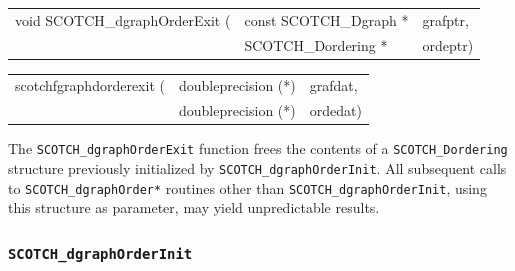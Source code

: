 \begin{itemize}
\progsyn

{\tt\begin{tabular}{l@{}ll}
void SCOTCH\_dgraphOrderExit ( & const SCOTCH\_Dgraph * & grafptr, \\
                               & SCOTCH\_Dordering *    & ordeptr)
\end{tabular}}

{\tt\begin{tabular}{l@{}ll}
scotchfgraphdorderexit ( & doubleprecision (*) & grafdat, \\
                         & doubleprecision (*) & ordedat)
\end{tabular}}

\progdes

The {\tt SCOTCH\_dgraphOrderExit} function frees the contents of a
{\tt SCOTCH\_\lbt Dordering} structure previously initialized by
{\tt SCOTCH\_\lbt dgraph\lbt Order\lbt Init}. All subsequent calls to
{\tt SCOTCH\_\lbt dgraph\lbt Order*} routines other than
{\tt SCOTCH\_\lbt dgraph\lbt Order\lbt Init}, using this structure
as parameter, may yield unpredictable results.
\end{itemize}

\subsubsection{{\tt SCOTCH\_dgraphOrderInit}}
\label{sec-lib-dgraphorderinit}

